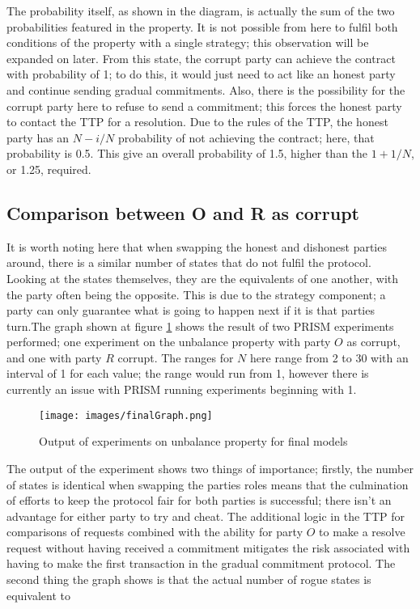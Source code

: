 \documentclass{l4proj}
\begin{document}
The probability itself, as shown in the diagram, is actually the sum of the two probabilities featured in the property. It is not possible from here to fulfil both conditions of the property with a single strategy; this observation will be expanded on later. From this state, the corrupt party can achieve the contract with probability of 1; to do this, it would just need to act like an honest party and continue sending gradual commitments. Also, there is the possibility for the corrupt party here to refuse to send a commitment; this forces the honest party to contact the TTP for a resolution. Due to the rules of the TTP, the honest party has an $N-i/N$ probability of not achieving the contract; here, that probability is 0.5. This give an overall probability of 1.5, higher than the $1+1/N$, or 1.25, required.

\subsection{Comparison between O and R as corrupt}
It is worth noting here that when swapping the honest and dishonest parties around, there is a similar number of states that do not fulfil the protocol. Looking at the states themselves, they are the equivalents of one another, with the party often being the opposite. This is due to the strategy component; a party can only guarantee what is going to happen next if it is that parties turn.The graph shown at figure \ref{finalGraph} shows the result of two PRISM experiments performed; one experiment on the unbalance property with party $O$ as corrupt, and one with party $R$ corrupt. The ranges for $N$ here range from 2 to 30 with an interval of 1 for each value; the range would run from 1, however there is currently an issue with PRISM running experiments beginning with 1.

\begin{figure}[h!]
\centering
\texttt{[image: images/finalGraph.png]}
\caption{Output of experiments on unbalance property for final models}
\label{finalGraph}
\end{figure}

The output of the experiment shows two things of importance; firstly, the number of states is identical when swapping the parties roles means that the culmination of efforts to keep the protocol fair for both parties is successful; there isn't an advantage for either party to try and cheat. The additional logic in the TTP for comparisons of requests combined with the ability for party $O$ to make a resolve request without having received a commitment mitigates the risk associated with having to make the first transaction in the gradual commitment protocol. The second thing the graph shows is that the actual number of rogue states is equivalent to\\
\end{document}
